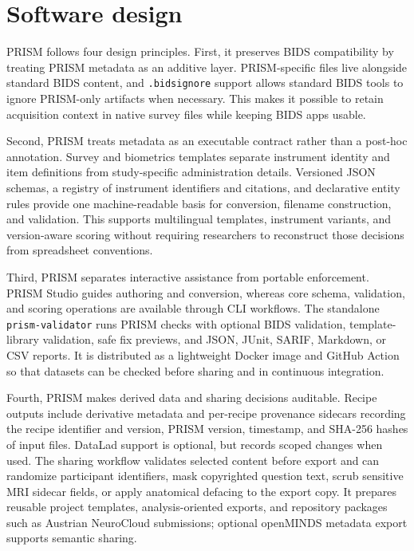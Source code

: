 \documentclass[
]{article}
\begin{document}
\section{Software design}\label{software-design}

PRISM follows four design principles. First, it preserves BIDS
compatibility by treating PRISM metadata as an additive layer.
PRISM-specific files live alongside standard BIDS content, and
\texttt{.bidsignore} support allows standard BIDS tools to ignore
PRISM-only artifacts when necessary. This makes it possible to retain
acquisition context in native survey files while keeping BIDS apps
usable.

Second, PRISM treats metadata as an executable contract rather than a
post-hoc annotation. Survey and biometrics templates separate instrument
identity and item definitions from study-specific administration
details. Versioned JSON schemas, a registry of instrument identifiers
and citations, and declarative entity rules provide one machine-readable
basis for conversion, filename construction, and validation. This
supports multilingual templates, instrument variants, and version-aware
scoring without requiring researchers to reconstruct those decisions
from spreadsheet conventions.

Third, PRISM separates interactive assistance from portable enforcement.
PRISM Studio guides authoring and conversion, whereas core schema,
validation, and scoring operations are available through CLI workflows.
The standalone \texttt{prism-validator} runs PRISM checks with optional
BIDS validation, template-library validation, safe fix previews, and
JSON, JUnit, SARIF, Markdown, or CSV reports. It is distributed as a
lightweight Docker image and GitHub Action so that datasets can be
checked before sharing and in continuous integration.

Fourth, PRISM makes derived data and sharing decisions auditable. Recipe
outputs include derivative metadata and per-recipe provenance sidecars
recording the recipe identifier and version, PRISM version, timestamp,
and SHA-256 hashes of input files. DataLad support is optional, but
records scoped changes when used. The sharing workflow validates
selected content before export and can randomize participant
identifiers, mask copyrighted question text, scrub sensitive MRI sidecar
fields, or apply anatomical defacing to the export copy. It prepares
reusable project templates, analysis-oriented exports, and repository
packages such as Austrian NeuroCloud submissions; optional openMINDS
metadata export supports semantic sharing.
\end{document}
